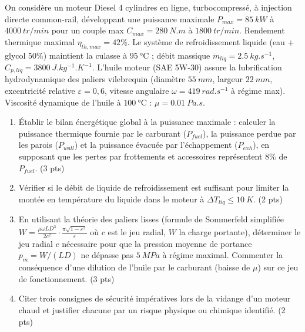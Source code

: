 \documentclass[11pt]{article}
\begin{document}
\begin{exercice}
On considère un moteur Diesel 4 cylindres en ligne, turbocompressé, à injection directe common-rail, développant une puissance maximale $P_{max} = \SI{85}{kW}$ à $\SI{4000}{tr/min}$ pour un couple max $C_{max} = \SI{280}{N.m}$ à $\SI{1800}{tr/min}$. Rendement thermique maximal $\eta_{th,max} = 42\%$. Le système de refroidissement liquide (eau + glycol 50\%) maintient la culasse à $\SI{95}{\celsius}$ ; débit massique $\dot{m}_{liq} = \SI{2,5}{kg.s^{-1}}$, $C_{p,liq} = \SI{3800}{J.kg^{-1}.K^{-1}}$. L'huile moteur (SAE 5W-30) assure la lubrification hydrodynamique des paliers vilebrequin (diamètre $\SI{55}{mm}$, largeur $\SI{22}{mm}$, excentricité relative $\varepsilon = 0,6$, vitesse angulaire $\omega = \SI{419}{rad.s^{-1}}$ à régime max). Viscosité dynamique de l'huile à $\SI{100}{\celsius}$ : $\mu = \SI{0,01}{Pa.s}$.
\begin{enumerate}
    \item Établir le bilan énergétique global à la puissance maximale : calculer la puissance thermique fournie par le carburant ($P_{fuel}$), la puissance perdue par les parois ($P_{wall}$) et la puissance évacuée par l'échappement ($P_{exh}$), en supposant que les pertes par frottements et accessoires représentent $8\%$ de $P_{fuel}$. (3 pts)
    \item Vérifier si le débit de liquide de refroidissement est suffisant pour limiter la montée en température du liquide dans le moteur à $\Delta T_{liq} \le \SI{10}{K}$. (2 pts)
    \item En utilisant la théorie des paliers lisses (formule de Sommerfeld simplifiée $W = \frac{\mu \omega L D^3}{2 c^2} \cdot \frac{\pi \sqrt{1-\varepsilon^2}}{\varepsilon}$ où $c$ est le jeu radial, $W$ la charge portante), déterminer le jeu radial $c$ nécessaire pour que la pression moyenne de portance $p_m = W/(L D)$ ne dépasse pas $\SI{5}{MPa}$ à régime maximal. Commenter la conséquence d'une dilution de l'huile par le carburant (baisse de $\mu$) sur ce jeu de fonctionnement. (3 pts)
    \item Citer trois consignes de sécurité impératives lors de la vidange d'un moteur chaud et justifier chacune par un risque physique ou chimique identifié. (2 pts)
\end{enumerate}
\end{exercice}
\end{document}
